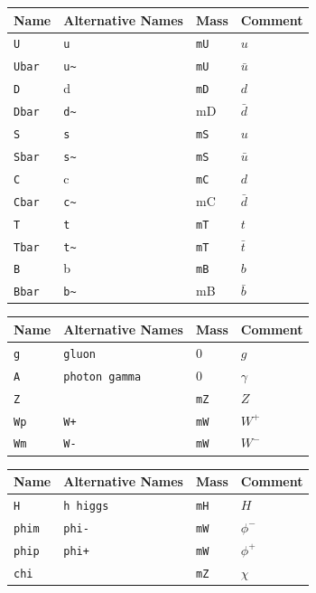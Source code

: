 \documentclass[11pt,a4paper]{refrep}
\begin{document}
\begin{tabular}{|l|l|l|p{2cm}|}
\hline
Name&Alternative Names&Mass&Comment\\
\hline
\tt U & \tt u & \tt mU& $u$\\
\tt Ubar & \tt u\~ & \tt mU& $\bar{u}$\\
\tt D & d & \tt mD & $d$\\
\tt Dbar & \tt d\~& mD & $\bar{d}$\\
\hline
\tt S & \tt s & \tt mS& $u$\\
\tt Sbar & \tt s\~ & \tt mS& $\bar{u}$\\
\tt C & c & \tt mC & $d$\\
\tt Cbar & \tt c\~& mC & $\bar{d}$\\
\hline
\tt T & \tt t & \tt mT& $t$\\
\tt Tbar & \tt t\~ & \tt mT& $\bar{t}$\\
\tt B & b & \tt mB & $b$\\
\tt Bbar & \tt b\~& mB & $\bar{b}$\\
\hline
\end{tabular}

\begin{tabular}{|l|l|l|p{2cm}|}
\hline
Name&Alternative Names&Mass&Comment\\
\hline
\tt g & \tt gluon & $0$ & $g$ \\
\tt A & \tt photon gamma & $0$ & $\gamma$ \\
\tt Z & & \tt mZ & $Z$ \\
\tt Wp & \tt W+& \tt mW & $W^+$ \\
\tt Wm & \tt W-& \tt mW & $W^-$ \\
\hline
\end{tabular}

\begin{tabular}{|l|l|l|p{2cm}|}
\hline
Name&Alternative Names&Mass&Comment\\
\hline
\tt H & \tt h higgs & \tt mH & $H$ \\
\tt phim & \tt phi- & \tt mW & $\phi^-$ \\
\tt phip & \tt phi+ & \tt mW & $\phi^+$ \\
\tt chi &  & \tt mZ & $\chi$ \\
\hline
\end{tabular}
\end{document}
